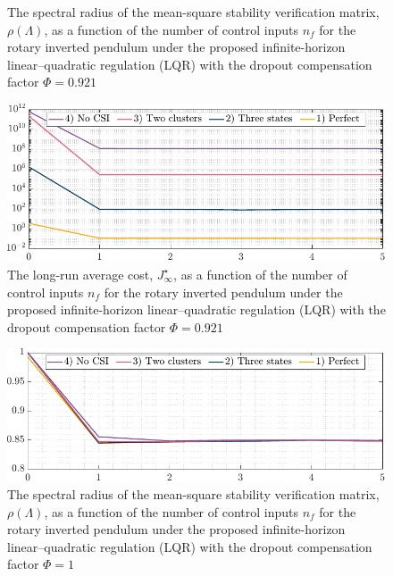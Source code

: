 {\begin{figure}[h!]
\begin{center}
\caption{The spectral radius of the mean-square stability verification matrix, $\rho(\mathit{\Lambda})$, as a function of the number of control inputs $n_f$ for the rotary inverted pendulum under the proposed infinite-horizon linear–quadratic regulation (LQR) with the dropout compensation factor $\mathit{\Phi}=0.921$}\label{fig:stability-coeff-9}
\end{center}
\end{figure}
\begin{figure}[h!]
\begin{center}
\includegraphics[width=0.8\columnwidth]{./responses-rev-1/cost-cntrl-9.pdf}
\caption{The long-run average cost, $J_{\infty}^{\star}$, as a function of the number of control inputs $n_f$ for the rotary inverted pendulum under the proposed infinite-horizon linear–quadratic regulation (LQR) with the dropout compensation factor $\mathit{\Phi}=0.921$}\label{fig:cost-cntrl-9}
\end{center}
\end{figure}
\begin{figure}[h!]
\begin{center}
\includegraphics[width=0.8\columnwidth]{./responses-rev-1/stability-cntrl-1.pdf}
\caption{The spectral radius of the mean-square stability verification matrix, $\rho(\mathit{\Lambda})$, as a function of the number of control inputs $n_f$ for the rotary inverted pendulum under the proposed infinite-horizon linear–quadratic regulation (LQR) with the dropout compensation factor $\mathit{\Phi}=1$}\label{fig:stability-coeff-1}
\end{center}
\end{figure}
\begin{figure}[h!]

\end{figure}}
